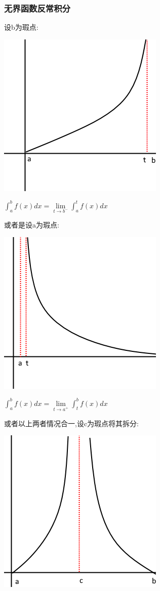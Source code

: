 \documentclass[UTF8]{ctexbook}
\newcommand{\limNormal}[1]{\lim\limits_{#1}}
\newcommand{\defFunction}[1]{f(#1)}
\newcommand{\definiteIntegral}[2]{\int^{#1}_{#2}}
\begin{document}
{{{\subsubsection{无界函数反常积分}{

  设b为瑕点:

  \includegraphics[scale=0.5]{resources/infityFunctionUnormalIntegral.png}

  $\definiteIntegral{b}{a}\defFunction{x}dx = \limNormal{t \to b^-}\definiteIntegral{t}{a}\defFunction{x}dx$

  或者是设a为瑕点:

  \includegraphics[scale=0.5]{resources/infityFunctionUnormalIntegral2.png}

  $\definiteIntegral{b}{a}\defFunction{x}dx = \limNormal{t \to a^+}\definiteIntegral{b}{t}\defFunction{x}dx$

  或者以上两者情况合一,设c为瑕点将其拆分:

  \includegraphics{resources/infityFunctionUnormalIntegral3.png}

}}}}
\end{document}
